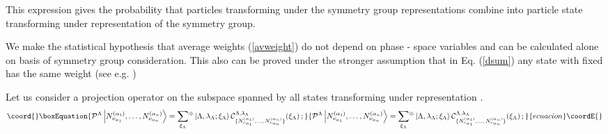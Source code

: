 \documentclass[a4paper,11pt]{article}
\begin{document}
This expression gives the probability that
\coordHE{} particles transforming under the symmetry group
representations \coordHE{} combine into \coordHE{}
particle state transforming under representation \myHighlight{$\Lambda$}\coordHE{} of the
symmetry group.

We make the statistical hypothesis that average weights
(\ref{avweight}) do not depend on phase - space variables and can
be calculated alone on basis of symmetry group consideration. This
also can be proved under the stronger assumption that in Eq.
(\ref{dsum}) any state with fixed \myHighlight{$\Lambda, \lambda_\Lambda$}\coordHE{} has
the same weight (see e.g. \cite{Cerul})

Let us consider a projection operator \coordHE{} on the
subspace spanned by all states transforming under representation
\myHighlight{$\Lambda$}\coordHE{}.
\begin{equation}\coord{}\boxEquation{ \label{proj1states}
{\cal P}^{\Lambda}\left\vert
N^{(\alpha_1)}_{\nu_{\alpha_1}},\dots,
N^{(\alpha_n)}_{\nu_{\alpha_n}}\right\rangle=\sum_{\xi_{\Lambda}}\!^{\oplus}
\left\vert \Lambda, \lambda_{\Lambda};\xi_\Lambda\right\rangle
 {\cal C}^{\Lambda,\lambda_{\Lambda}}_{\{N^{(\alpha_1)}_{\nu_{\alpha_1}},
\dots,\,N^{(\alpha_n)}_{\nu_{\alpha_n}}\}}(\xi_\Lambda)\,;
}{ {\cal P}^{\Lambda}\left\vert
N^{(\alpha_1)}_{\nu_{\alpha_1}},\dots,
N^{(\alpha_n)}_{\nu_{\alpha_n}}\right\rangle=\sum_{\xi_{\Lambda}}\!^{\oplus}
\left\vert \Lambda, \lambda_{\Lambda};\xi_\Lambda\right\rangle
 {\cal C}^{\Lambda,\lambda_{\Lambda}}_{\{N^{(\alpha_1)}_{\nu_{\alpha_1}},
\dots,\,N^{(\alpha_n)}_{\nu_{\alpha_n}}\}}(\xi_\Lambda)\,;
}{ecuacion}\coordE{}\end{equation}
\end{document}
